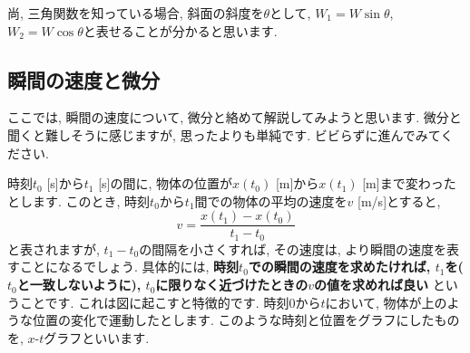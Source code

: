 \documentclass[11pt,dvipdfmx]{jsarticle}
\numberwithin{equation}{section} %
\begin{document}
尚, 三角関数を知っている場合, 斜面の斜度を$\theta$として, $W_{1} = W\sin{\theta}$, $W_{2} = W\cos{\theta}$と表せることが分かると思います.

\subsection{瞬間の速度と微分}\label{瞬間の速さと微分}
ここでは, 瞬間の速度について, 微分と絡めて解説してみようと思います. 微分と聞くと難しそうに感じますが, 思ったよりも単純です. ビビらずに進んでみてください. 

時刻$t_0$ [s]から$t_{1}$ [s]の間に, 物体の位置が$x(t_{0})$ [m]から$x(t_{1})$ [m]まで変わったとします. このとき, 時刻$t_{0}$から$t_{1}$間での物体の平均の速度を$v$ [m/s]とすると, 
\begin{equation}
    v = \frac{x(t_{1}) - x(t_{0})}{t_{1} - t_{0}} \label{微分の説明}
\end{equation}
と表されますが, $t_{1} - t_{0}$の間隔を小さくすれば, その速度は, より瞬間の速度を表すことになるでしょう. 具体的には, \textbf{時刻$t_{0}$での瞬間の速度を求めたければ, $t_{1}$を($t_{0}$と一致しないように), $t_{0}$に限りなく近づけたときの$v$の値を求めれば良い} ということです. これは図に起こすと特徴的です. 
時刻$0$から$t$において, 物体が上のような位置の変化で運動したとします. このような時刻と位置をグラフにしたものを, $x$-$t$グラフといいます. 
\end{document}
